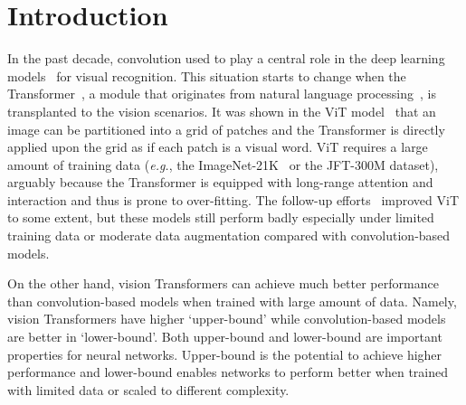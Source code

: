 \documentclass[10pt,twocolumn,letterpaper]{article}
\begin{document}
\section{Introduction}

In the past decade, convolution used to play a central role in the deep learning models~\cite{lecun2015deep, simonyan2014very, szegedy2015going, he2016deep} for visual recognition. This situation starts to change when the Transformer~\cite{vaswani2017attention}, a module that originates from natural language processing~\cite{vaswani2017attention, devlin2018bert,radford2018improving}, is transplanted to the vision scenarios. It was shown in the ViT model~\cite{dosovitskiy2020image} that an image can be partitioned into a grid of patches and the Transformer is directly applied upon the grid as if each patch is a visual word. ViT requires a large amount of training data (\textit{e.g.}, the ImageNet-21K~\cite{deng2009imagenet} or the JFT-300M dataset), arguably because the Transformer is equipped with long-range attention and interaction and thus is prone to over-fitting. The follow-up efforts~\cite{touvron2020training} improved ViT to some extent, but these models still perform badly especially under limited training data or moderate data augmentation compared with convolution-based models.

On the other hand, vision Transformers can achieve much better performance than convolution-based models when trained with large amount of data. Namely, vision Transformers have higher `upper-bound' while convolution-based models are better in `lower-bound'. Both upper-bound and lower-bound are important properties for neural networks. Upper-bound is the potential to achieve higher performance and lower-bound enables networks to perform better when trained with limited data or scaled to different complexity.
\end{document}

